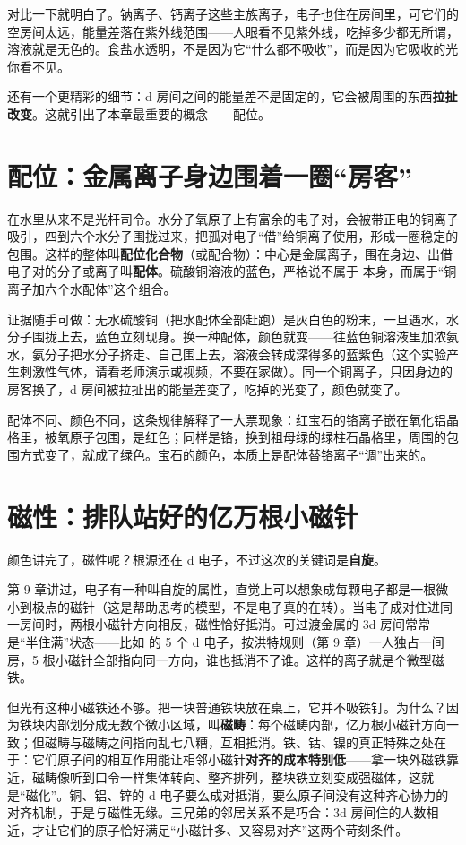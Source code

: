 对比一下就明白了。钠离子、钙离子这些主族离子，电子也住在房间里，可它们的空房间太远，能量差落在紫外线范围——人眼看不见紫外线，吃掉多少都无所谓，溶液就是无色的。食盐水透明，不是因为它“什么都不吸收”，而是因为它吸收的光你看不见。

还有一个更精彩的细节：d 房间之间的能量差不是固定的，它会被周围的东西\textbf{拉扯改变}。这就引出了本章最重要的概念——配位。

\section{配位：金属离子身边围着一圈“房客”}

 在水里从来不是光杆司令。水分子氧原子上有富余的电子对，会被带正电的铜离子吸引，四到六个水分子围拢过来，把孤对电子“借”给铜离子使用，形成一圈稳定的包围。这样的整体叫\textbf{配位化合物}（或配合物）：中心是金属离子，围在身边、出借电子对的分子或离子叫\textbf{配体}。硫酸铜溶液的蓝色，严格说不属于  本身，而属于“铜离子加六个水配体”这个组合。

证据随手可做：无水硫酸铜（把水配体全部赶跑）是灰白色的粉末，一旦遇水，水分子围拢上去，蓝色立刻现身。换一种配体，颜色就变——往蓝色铜溶液里加浓氨水，氨分子把水分子挤走、自己围上去，溶液会转成深得多的蓝紫色（这个实验产生刺激性气体，请看老师演示或视频，不要在家做）。同一个铜离子，只因身边的房客换了，d 房间被拉扯出的能量差变了，吃掉的光变了，颜色就变了。

配体不同、颜色不同，这条规律解释了一大票现象：红宝石的铬离子嵌在氧化铝晶格里，被氧原子包围，是红色；同样是铬，换到祖母绿的绿柱石晶格里，周围的包围方式变了，就成了绿色。宝石的颜色，本质上是配体替铬离子“调”出来的。

\section{磁性：排队站好的亿万根小磁针}

颜色讲完了，磁性呢？根源还在 d 电子，不过这次的关键词是\textbf{自旋}。

第 9 章讲过，电子有一种叫自旋的属性，直觉上可以想象成每颗电子都是一根微小到极点的磁针（这是帮助思考的模型，不是电子真的在转）。当电子成对住进同一房间时，两根小磁针方向相反，磁性恰好抵消。可过渡金属的 3d 房间常常是“半住满”状态——比如  的 5 个 d 电子，按洪特规则（第 9 章）一人独占一间房，5 根小磁针全部指向同一方向，谁也抵消不了谁。这样的离子就是个微型磁铁。

但光有这种小磁铁还不够。把一块普通铁块放在桌上，它并不吸铁钉。为什么？因为铁块内部划分成无数个微小区域，叫\textbf{磁畴}：每个磁畴内部，亿万根小磁针方向一致；但磁畴与磁畴之间指向乱七八糟，互相抵消。铁、钴、镍的真正特殊之处在于：它们原子间的相互作用能让相邻小磁针\textbf{对齐的成本特别低}——拿一块外磁铁靠近，磁畴像听到口令一样集体转向、整齐排列，整块铁立刻变成强磁体，这就是“磁化”。铜、铝、锌的 d 电子要么成对抵消，要么原子间没有这种齐心协力的对齐机制，于是与磁性无缘。三兄弟的邻居关系不是巧合：3d 房间住的人数相近，才让它们的原子恰好满足“小磁针多、又容易对齐”这两个苛刻条件。

